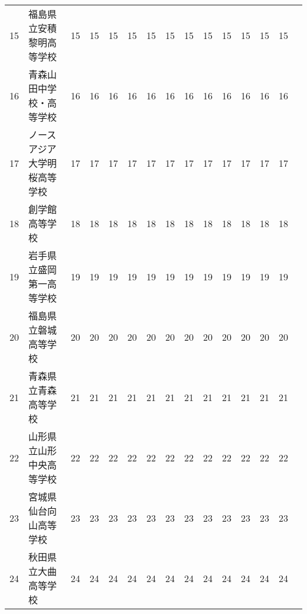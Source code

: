 \documentclass[11pt,a4paper,landscape,twoside,openany,english,uplatex]{jsarticle}
\begin{document}
\begin{table}[h]
\begin{tabular}{r|l||rrrrrrrrrrrrr}
  15 & 福島県立安積黎明高等学校     & 15 & 15 & 15 & 15 & 15 & 15 & 15 & 15 & 15 & 15  & 15 & 15 \\
  16 & 青森山田中学校・高等学校     & 16 & 16 & 16 & 16 & 16 & 16 & 16 & 16 & 16 & 16  & 16 & 16 \\
  \hline
  17 & ノースアジア大学明桜高等学校 & 17 & 17 & 17 & 17 & 17 & 17 & 17 & 17 & 17 & 17  & 17 & 17 \\
  18 & 創学館高等学校               & 18 & 18 & 18 & 18 & 18 & 18 & 18 & 18 & 18 & 18  & 18 & 18 \\
  19 & 岩手県立盛岡第一高等学校     & 19 & 19 & 19 & 19 & 19 & 19 & 19 & 19 & 19 & 19  & 19 & 19 \\
  20 & 福島県立磐城高等学校         & 20 & 20 & 20 & 20 & 20 & 20 & 20 & 20 & 20 & 20  & 20 & 20 \\
  21 & 青森県立青森高等学校         & 21 & 21 & 21 & 21 & 21 & 21 & 21 & 21 & 21 & 21  & 21 & 21 \\
  22 & 山形県立山形中央高等学校     & 22 & 22 & 22 & 22 & 22 & 22 & 22 & 22 & 22 & 22  & 22 & 22 \\
  23 & 宮城県仙台向山高等学校       & 23 & 23 & 23 & 23 & 23 & 23 & 23 & 23 & 23 & 23  & 23 & 23 \\
  24 & 秋田県立大曲高等学校         & 24 & 24 & 24 & 24 & 24 & 24 & 24 & 24 & 24 & 24  & 24 & 24 \\

  \hline
 \end{tabular}
\end{table}
\end{document}
